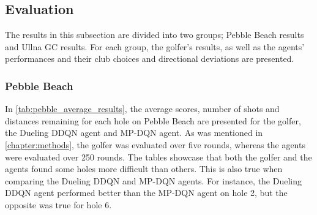 \documentclass{kththesis}
\begin{document}
\subsection{Evaluation}
The results in this subsection are divided into two groups; Pebble Beach results and Ullna GC results. For each group, the golfer's results, as well as the agents' performances and their club choices and directional deviations are presented.

\subsubsection{Pebble Beach}
In \autoref{tab:pebble_average_results}, the average scores, number of shots and distances remaining for each hole on Pebble Beach are presented for the golfer, the Dueling DDQN agent and MP-DQN agent. As was mentioned in \autoref{chapter:methods}, the golfer was evaluated over five rounds, whereas the agents were evaluated over 250 rounds. The tables showcase that both the golfer and the agents found some holes more difficult than others. This is also true when comparing the Dueling DDQN and MP-DQN agents. For instance, the Dueling DDQN agent performed better than the MP-DQN agent on hole 2, but the opposite was true for hole 6.
\end{document}
